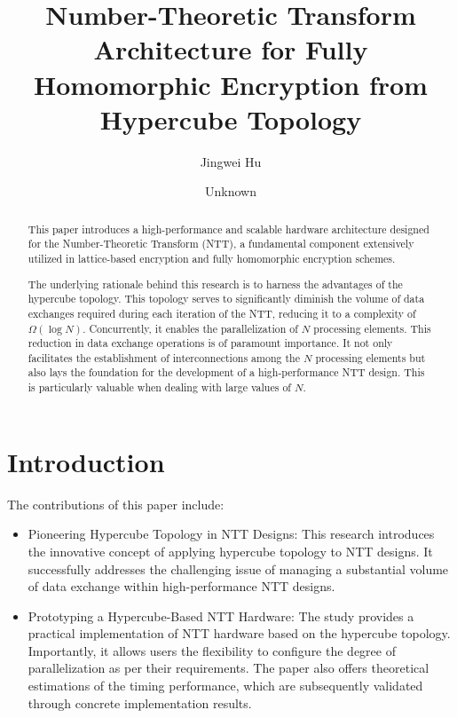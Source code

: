 \documentclass{iacrtrans}
\author{Jingwei Hu\inst{1} \and Unknown\inst{2}}
\institute{Nanyang Technological University, Singapore, \email{davidhu@ntu.edu.sg} \and
           Unknown}
\title[]{Number-Theoretic Transform Architecture for Fully Homomorphic Encryption from Hypercube Topology}
\subtitle{}
\theoremstyle{plain}
\begin{document}
\maketitle


\begin{abstract}
This paper introduces a high-performance and scalable hardware architecture designed for the Number-Theoretic Transform (NTT), a fundamental component extensively utilized in lattice-based encryption and fully homomorphic encryption schemes.

The underlying rationale behind this research is to harness the advantages of the hypercube topology. This topology serves to significantly diminish the volume of data exchanges required during each iteration of the NTT, reducing it to a complexity of $\Omega(\log N)$. Concurrently, it enables the parallelization of $N$ processing elements. This reduction in data exchange operations is of paramount importance. It not only facilitates the establishment of interconnections among the $N$ processing elements but also lays the foundation for the development of a high-performance NTT design. This is particularly valuable when dealing with large values of $N$.
\end{abstract}
\newpage
\tableofcontents{}
\newpage

\section*{Introduction}

The contributions of this paper include:
\begin{itemize}
    \item Pioneering Hypercube Topology in NTT Designs: This research introduces the innovative concept of applying hypercube topology to NTT designs. It successfully addresses the challenging issue of managing a substantial volume of data exchange within high-performance NTT designs.
    \item Prototyping a Hypercube-Based NTT Hardware: The study provides a practical implementation of NTT hardware based on the hypercube topology. Importantly, it allows users the flexibility to configure the degree of parallelization as per their requirements. The paper also offers theoretical estimations of the timing performance, which are subsequently validated through concrete implementation results.
\end{itemize}
\end{document}
